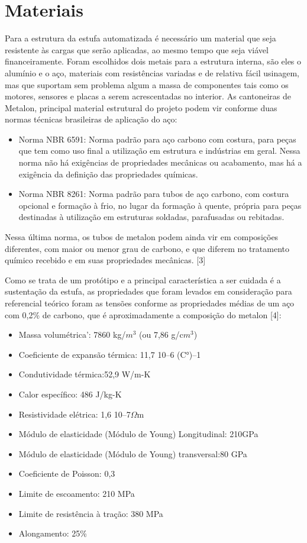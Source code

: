 \section{Materiais}

Para a estrutura da estufa automatizada é necessário um material que seja resistente às cargas que serão aplicadas, ao mesmo tempo que seja viável financeiramente. Foram escolhidos dois metais para a estrutura interna, são eles o alumínio e o aço, materiais com resistências variadas e de relativa fácil usinagem, mas que suportam sem problema algum a massa de componentes tais como os motores, sensores e placas a serem acrescentadas no interior. As cantoneiras de Metalon, principal material estrutural do projeto podem vir conforme duas normas técnicas brasileiras de aplicação do aço:

\begin{itemize}
	\item Norma NBR 6591: Norma padrão para aço carbono com costura, para peças que tem como uso final a utilização em estrutura e indústrias em geral. Nessa norma não há exigências de propriedades mecânicas ou acabamento, mas há a exigência da definição das propriedades químicas.
	\item Norma NBR 8261: Norma padrão para tubos de aço carbono, com costura opcional e formação à frio, no lugar da formação à quente, própria para peças destinadas à utilização em estruturas soldadas, parafusadas ou rebitadas.
\end{itemize}

Nessa última norma, os tubos de metalon podem ainda vir em composições diferentes, com maior ou menor grau de carbono, e que diferem no tratamento químico recebido e em suas propriedades mecânicas. [3]

Como se trata de um protótipo e a principal característica a ser cuidada é a sustentação da estufa, as propriedades que foram levados em consideração para referencial teórico foram as tensões conforme 	as propriedades médias de um aço com 0,2\% de carbono, que é aproximadamente a composição do metalon [4]:

\begin{itemize}
	\item Massa volumétrica': 7860 kg/$m{^3}$ (ou 7,86 g/c$m{^3}$)
	\item Coeficiente de expansão térmica: 11,7 10--6 (C°)--1
	\item Condutividade térmica:52,9 W/m-K
	\item Calor específico: 486 J/kg-K
	\item Resistividade elétrica: 1,6 10--7$\Omega$m
	\item Módulo de elasticidade (Módulo de Young) Longitudinal: 210GPa
	\item Módulo de elasticidade (Módulo de Young) transversal:80 GPa
	\item Coeficiente de Poisson: 0,3
	\item Limite de escoamento: 210 MPa
	\item Limite de resistência à tração: 380 MPa
	\item Alongamento: 25\%
\end{itemize}

